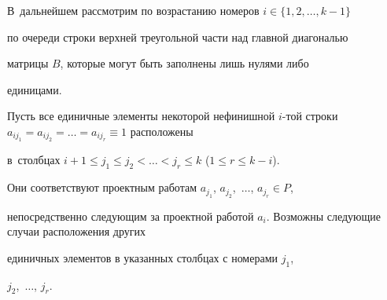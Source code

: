 
В~дальнейшем рассмотрим по возрастанию номеров $i\in \{1, 2, \dots, k-1\}$

по очереди строки верхней треугольной части над главной диагональю

матрицы $B$, которые могут быть заполнены лишь нулями либо

единицами. 

Пусть все единичные элементы некоторой нефинишной $i$-той строки $a_{ij_1}=a_{ij_2}=\dots =a_{ij_{r}}\equiv 1$ расположены 

в~столбцах ${i+1}\leq j_1\leq j_2<\dots <j_{r}\leq k$ ($1\leq r\leq k-i$). 

Они соответствуют проектным работам $a_{j_1}$, $a_{j_2}$,~$\dots$, $a_{j_r} \in P$,  

непосредственно следующим за проектной работой $a_i$. Возможны следующие случаи  расположения других

единичных элементов в указанных столбцах с номерами  $j_1$,

$j_2$,~$\dots$, $j_{r}$.





